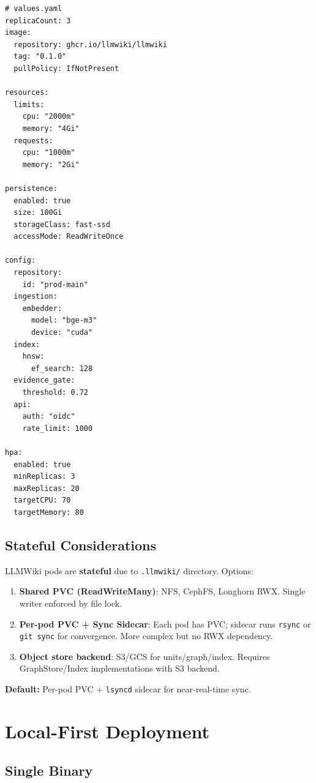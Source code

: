 \begin{verbatim}
# values.yaml
replicaCount: 3
image:
  repository: ghcr.io/llmwiki/llmwiki
  tag: "0.1.0"
  pullPolicy: IfNotPresent

resources:
  limits:
    cpu: "2000m"
    memory: "4Gi"
  requests:
    cpu: "1000m"
    memory: "2Gi"

persistence:
  enabled: true
  size: 100Gi
  storageClass: fast-ssd
  accessMode: ReadWriteOnce

config:
  repository:
    id: "prod-main"
  ingestion:
    embedder:
      model: "bge-m3"
      device: "cuda"
  index:
    hnsw:
      ef_search: 128
  evidence_gate:
    threshold: 0.72
  api:
    auth: "oidc"
    rate_limit: 1000

hpa:
  enabled: true
  minReplicas: 3
  maxReplicas: 20
  targetCPU: 70
  targetMemory: 80
\end{verbatim}

\subsection{Stateful Considerations}
\label{sec:deploy:stateful}

LLMWiki pods are \textbf{stateful} due to \texttt{.llmwiki/} directory. Options:

\begin{enumerate}
  \item \textbf{Shared PVC (ReadWriteMany)}: NFS, CephFS, Longhorn RWX. Single writer enforced by file lock.
  \item \textbf{Per-pod PVC + Sync Sidecar}: Each pod has PVC; sidecar runs \texttt{rsync} or \texttt{git sync} for convergence. More complex but no RWX dependency.
  \item \textbf{Object store backend}: S3/GCS for units/graph/index. Requires GraphStore/Index implementations with S3 backend.
\end{enumerate}

\textbf{Default:} Per-pod PVC + \texttt{lsyncd} sidecar for near-real-time sync.

\section{Local-First Deployment}
\label{sec:deploy:local}

\subsection{Single Binary}
\label{sec:deploy:single-binary}


